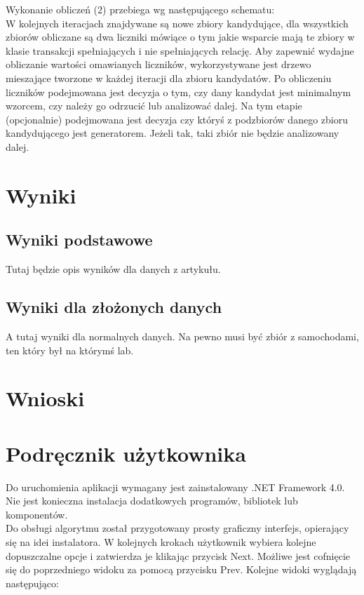 \documentclass[a4paper,12pt]{article}
\begin{document}
Wykonanie obliczeń (2) przebiega wg następującego schematu:\\

W kolejnych iteracjach znajdywane są nowe zbiory kandydujące, dla wszystkich zbiorów obliczane są dwa liczniki mówiące o tym jakie wsparcie mają te zbiory w klasie transakcji spełniających i nie spełniających relację. Aby zapewnić wydajne obliczanie wartości omawianych liczników, wykorzystywane jest drzewo mieszające tworzone w każdej iteracji dla zbioru kandydatów. Po obliczeniu liczników podejmowana jest decyzja o tym, czy dany kandydat
jest minimalnym wzorcem, czy należy go odrzucić lub analizować dalej. Na tym etapie (opcjonalnie) podejmowana jest decyzja czy któryś z podzbiorów danego zbioru kandydującego jest generatorem. Jeżeli tak, taki zbiór nie będzie analizowany dalej.

\section{Wyniki}

\subsection{Wyniki podstawowe}

Tutaj będzie opis wyników dla danych z artykułu.

\subsection{Wyniki dla złożonych danych}

A tutaj wyniki dla normalnych danych. Na pewno musi być zbiór z samochodami, ten który był na którymś lab.

\section{Wnioski}

\appendix
\section{Podręcznik użytkownika}

Do uruchomienia aplikacji wymagany jest zainstalowany .NET Framework 4.0. Nie jest konieczna instalacja dodatkowych programów, bibliotek lub komponentów.\\

Do obsługi algorytmu został przygotowany prosty graficzny interfejs, opierający
się na idei instalatora. W kolejnych krokach użytkownik wybiera kolejne dopuszczalne opcje i zatwierdza je klikając przycisk Next. Możliwe jest cofnięcie się do poprzedniego widoku za pomocą przycisku Prev. Kolejne widoki wyglądają następująco:
\end{document}
